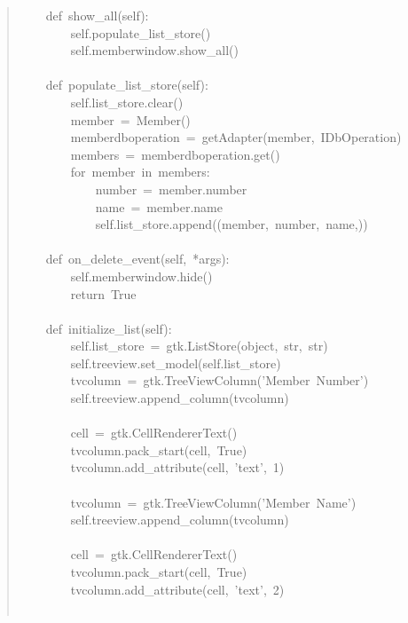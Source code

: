 \documentclass[a4paper,openany,twoside,final]{book}
\begin{document}
\begin{quote}
{~~~~def~show\_all(self):\\
~~~~~~~~self.populate\_list\_store()\\
~~~~~~~~self.memberwindow.show\_all()\\
~\\
~~~~def~populate\_list\_store(self):\\
~~~~~~~~self.list\_store.clear()\\
~~~~~~~~member~=~Member()\\
~~~~~~~~memberdboperation~=~getAdapter(member,~IDbOperation)\\
~~~~~~~~members~=~memberdboperation.get()\\
~~~~~~~~for~member~in~members:\\
~~~~~~~~~~~~number~=~member.number\\
~~~~~~~~~~~~name~=~member.name\\
~~~~~~~~~~~~self.list\_store.append((member,~number,~name,))\\
~\\
~~~~def~on\_delete\_event(self,~*args):\\
~~~~~~~~self.memberwindow.hide()\\
~~~~~~~~return~True\\
~\\
~~~~def~initialize\_list(self):\\
~~~~~~~~self.list\_store~=~gtk.ListStore(object,~str,~str)\\
~~~~~~~~self.treeview.set\_model(self.list\_store)\\
~~~~~~~~tvcolumn~=~gtk.TreeViewColumn('Member~Number')\\
~~~~~~~~self.treeview.append\_column(tvcolumn)\\
~\\
~~~~~~~~cell~=~gtk.CellRendererText()\\
~~~~~~~~tvcolumn.pack\_start(cell,~True)\\
~~~~~~~~tvcolumn.add\_attribute(cell,~'text',~1)\\
~\\
~~~~~~~~tvcolumn~=~gtk.TreeViewColumn('Member~Name')\\
~~~~~~~~self.treeview.append\_column(tvcolumn)\\
~\\
~~~~~~~~cell~=~gtk.CellRendererText()\\
~~~~~~~~tvcolumn.pack\_start(cell,~True)\\
~~~~~~~~tvcolumn.add\_attribute(cell,~'text',~2)\\
~\\
}
\end{quote}
\end{document}
